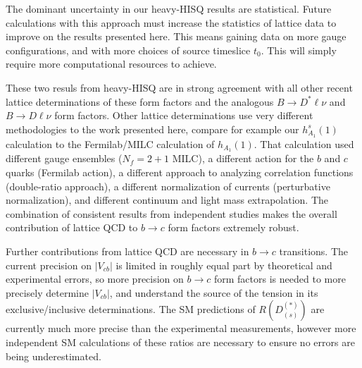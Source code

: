 The dominant uncertainty in our heavy-HISQ results are statistical. Future calculations with this approach must increase the statistics of lattice data to improve on the results presented here. This means gaining data on more gauge configurations, and with more choices of source timeslice $t_0$. This will simply require more computational resources to achieve.

These two resuls from heavy-HISQ are in strong agreement with all other recent lattice determinations of these form factors and the analogous $B\to D^*\ell \nu$ and $B\to D\ell\nu$ form factors. Other lattice determinations use very different methodologies to the work presented here, compare for example our $h_{A_1}^s(1)$ calculation to the Fermilab/MILC calculation of $h_{A_1}(1)$. That calculation used different gauge ensembles ($N_f=2+1$ MILC), a different action for the $b$ and $c$ quarks (Fermilab action), a different approach to analyzing correlation functions (double-ratio approach), a different normalization of currents (perturbative normalization), and different continuum and light mass extrapolation. The combination of consistent results from independent studies makes the overall contribution of lattice QCD to $b\to c$ form factors extremely robust.

Further contributions from lattice QCD are necessary in $b\to c$ transitions. The current precision on $|V_{cb}|$ is limited in roughly equal part by theoretical and experimental errors, so more precision on $b\to c$ form factors is needed to more precisely determine $|V_{cb}|$, and understand the source of the tension in its exclusive/inclusive determinations. The SM predictions of $R(D_{(s)}^{(*)})$ are currently much more precise than the experimental measurements, however more independent SM calculations of these ratios are necessary to ensure no errors are being underestimated.


